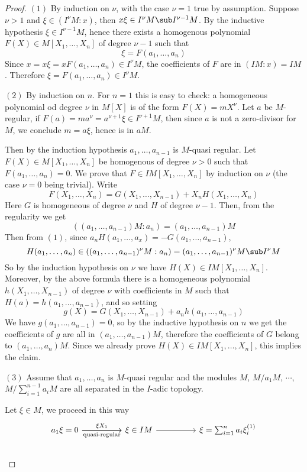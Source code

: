 \begin{proof}
$(1)$ By induction on $\nu$, with the case $\nu=1$ true by assumption. Suppose $\nu>1$ and $\xi\in(I^\nu M:x)$, then $x\xi\in I^{\nu}M\sub I^{\nu-1}M$. By the inductive hypothesis $\xi\in I^{\nu-1}M$, hence there exists a homogenous polynomial $F(X)\in M[X_1,\dots,X_n]$ of degree $\nu-1$ such that 
\[\xi=F(a_1,\dots,a_n)\] 
Since $x=x\xi=xF(a_1,\dots,a_n)\in I^\nu M$, the coefficients of $F$ are in $(IM:x)=IM$. Therefore $\xi=F(a_1,\dots,a_n)\in I^\nu M$.\par
$(2)$ By induction on $n$. For $n=1$ this is easy to check: a homogeneous polynomial od degree $\nu$ in $M[X]$ is of the form $F(X)=mX^{\nu}$. Let $a$ be $M$-regular, if $F(a)=ma^\nu=a^{\nu+1}\xi\in I^{\nu+1}M$, then since $a$ is not a zero-divisor for $M$, we conclude $m=a\xi$, hence is in $aM$.\par
Then by the induction hypothesis $a_1,\dots,a_{n-1}$ is $M$-quasi regular. Let $F(X)\in M[X_1,\dots,X_n]$ be homogenous of degree $\nu>0$ such that $F(a_1,\dots,a_n)=0$. We prove that $F\in IM[X_1,\dots,X_n]$ by induction on $\nu$ (the case $\nu=0$ being trivial). Write
\[F(X_1,\dots,X_n)=G(X_1,\dots,X_{n-1})+X_nH(X_1,\dots,X_n)\]
Here $G$ is homogeneous of degree $\nu$ and $H$ of degree $\nu-1$. Then, from the regularity we get
\[((a_1,\dots,a_{n-1})M:a_n)=(a_1,\dots,a_{n-1})M\] 
Then from $(1)$, since $a_nH(a_1,\dots,a_{x})=-G(a_1,\dots,a_{n-1})$,
\[H(a_1,\dots,a_n)\in((a_1,\dots,a_{n-1})^\nu M:a_n)=(a_1,\dots,a_{n-1})^\nu M\sub I^\nu M\]
So by the induction hypothesis on $\nu$ we have $H(X)\in IM[X_1,\dots,X_n]$. Moreover, by the above formula there is a homogeneous polynomial $h(X_1,\dots,X_{n-1})$ of degree $\nu$ with coefficients in $M$ such that $H(a)=h(a_1,\dots,a_{n-1})$, and so setting
\[g(X)=G(X_1,\dots,X_{n-1})+a_nh(a_1,\dots,a_{n-1})\]
We have $g(a_1,\dots,a_{n-1})=0$, so by the inductive hypothesis on $n$ we get the coefficients of $g$ are all in $(a_1,\dots,a_{n-1})M$, therefore the coefficients of $G$ belong to $(a_1,\dots,a_n)M$. Since we already prove $H(X)\in IM[X_1,\dots,X_n]$, this implies the claim.\par
$(3)$ Assume that $a_1,\dots,a_n$ is $M$-quasi regular and the modules $M$, $M/a_1M$, $\cdots$, $M/\sum_{i=1}^{n-1}a_iM$ are all separated in the $I$-adic topology.\par 
Let $\xi\in M$, we proceed in this way
\[\begin{tikzcd}
a_1\xi=0\ar[rr,"\xi X_1"]\ar[rr,swap,"\text{quasi-regular}"]&&\xi\in IM\ar[rr]&&\xi=\sum_{i=1}^{n}a_i\xi_i^{(1)}\\

\end{tikzcd}\]
\end{proof}
